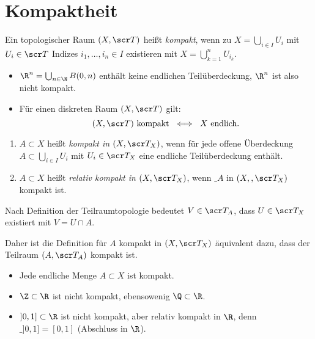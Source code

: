 \chapter{Kompaktheit}



\begin{df}
	Ein topologischer Raum $(X, \scr T)$ heißt \emph{kompakt}, wenn zu $X = \bigcup_{i\in I} U_i$ mit $U_i \in \scr T$ Indizes $i_1, \dotsc, i_n \in I$ existieren mit $X = \bigcup_{k=1}^n U_{i_k}$.
\end{df}

\begin{ex}
	\begin{itemize}
		\item
			$\R^n = \bigcup_{n\in\N} B(0,n)$ enthält keine endlichen Teilüberdeckung, $\R^n$ ist also nicht kompakt.
		\item
			Für einen diskreten Raum $(X, \scr T)$ gilt:
			\[
				(X, \scr T) \text{ kompakt }
				\iff
				\text{ $X$ endlich}.
			\]
	\end{itemize}
\end{ex}

\begin{df}
	\begin{enumerate}[(1)]
		\item
			$A \subset X$ heißt \emph{kompakt in $(X, \scr T_X)$}, wenn für jede offene Überdeckung $A \subset \bigcup_{i\in I} U_i$ mit $U_i \in \scr T_X$ eine endliche Teilüberdeckung enthält.
		\item
			$A \subset X$ heißt \emph{relativ kompakt in $(X, \scr T_X)$}, wenn $\_A$ in $(X,, \scr T_X)$ kompakt ist.
	\end{enumerate}
\end{df}

\begin{nt}
	Nach Definition der Teilraumtopologie %
	bedeutet $V \in \scr T_A$, dass $U \in \scr T_X$ existiert mit $V = U \cap A$.

	Daher ist die Definition für $A$ kompakt in $(X, \scr T_X)$ äquivalent dazu, dass der Teilraum $(A, \scr T_A)$ kompakt ist.
\end{nt}

\begin{ex}
	\begin{itemize}
		\item
			Jede endliche Menge $A \subset X$ ist kompakt.
		\item
			$\Z \subset \R$ ist nicht kompakt, ebensowenig $\Q \subset \R$.
		\item
			$]0,1] \subset \R$ ist nicht kompakt, aber relativ kompakt in $\R$, denn $\_{]0,1]} = [0,1]$ (Abschluss in $\R$).
	\end{itemize}
\end{ex}

